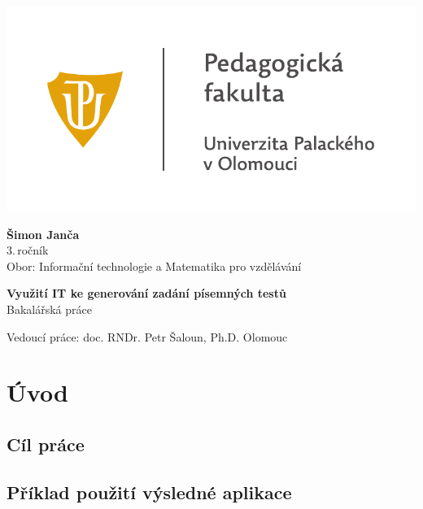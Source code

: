 \documentclass[14pt,a4paper]{article}
\begin{document}
	\begin{titlepage}
		\begin{center}
            {
            \centering
            \includegraphics[]{./PDF_tisk/UP_logo_PdF-UP_horizont_cz.pdf}
            }
			
			\vspace{3cm}

            {
                \LARGE
                \textbf{Šimon Janča}\\
                3.\,ročník\\[8mm]
                Obor: Informační technologie a Matematika pro vzdělávání
            }

            \vspace{4cm}
			
			{
			    \textbf{\Huge Využití IT ke generování zadání písemných testů}\\[4mm]
			    \Large
			    Bakalářská práce
			}

            \vfill
            
            {
                Vedoucí práce:
                doc. RNDr. Petr Šaloun, Ph.D.
                \hfill
    			Olomouc \the\year{}
            }
			
		\end{center}
	\end{titlepage}
	\tableofcontents
	
	\section{Úvod}
        \subsection{Cíl práce}
        \subsection{Příklad použití výsledné aplikace}
        
\end{document}

